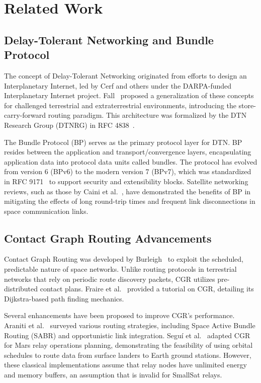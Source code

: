 \documentclass[a4paper,fleqn]{cas-dc}
\begin{document}
\section{Related Work}
\label{sec:related}

\subsection{Delay-Tolerant Networking and Bundle Protocol}
The concept of Delay-Tolerant Networking originated from efforts to design an Interplanetary Internet, led by Cerf and others under the DARPA-funded Interplanetary Internet project. Fall~\cite{fall2003dtn} proposed a generalization of these concepts for challenged terrestrial and extraterrestrial environments, introducing the store-carry-forward routing paradigm. This architecture was formalized by the DTN Research Group (DTNRG) in RFC 4838~\cite{cerf2007dtn}. 

The Bundle Protocol (BP) serves as the primary protocol layer for DTN. BP resides between the application and transport/convergence layers, encapsulating application data into protocol data units called bundles. The protocol has evolved from version 6 (BPv6) to the modern version 7 (BPv7), which was standardized in RFC 9171~\cite{rfc9171} to support security and extensibility blocks. Satellite networking reviews, such as those by Caini et al.~\cite{caini2011dtn}, have demonstrated the benefits of BP in mitigating the effects of long round-trip times and frequent link disconnections in space communication links.

\subsection{Contact Graph Routing Advancements}
Contact Graph Routing was developed by Burleigh~\cite{burleigh2010cgr} to exploit the scheduled, predictable nature of space networks. Unlike routing protocols in terrestrial networks that rely on periodic route discovery packets, CGR utilizes pre-distributed contact plans. Fraire et al.~\cite{fraire2021cgr} provided a tutorial on CGR, detailing its Dijkstra-based path finding mechanics. 

Several enhancements have been proposed to improve CGR's performance. Araniti et al.~\cite{araniti2015contact} surveyed various routing strategies, including Space Active Bundle Routing (SABR) and opportunistic link integration. Segu{\'i} et al.~\cite{segui2011enhancing} adapted CGR for Mars relay operations planning, demonstrating the feasibility of using orbital schedules to route data from surface landers to Earth ground stations. However, these classical implementations assume that relay nodes have unlimited energy and memory buffers, an assumption that is invalid for SmallSat relays.
\end{document}
